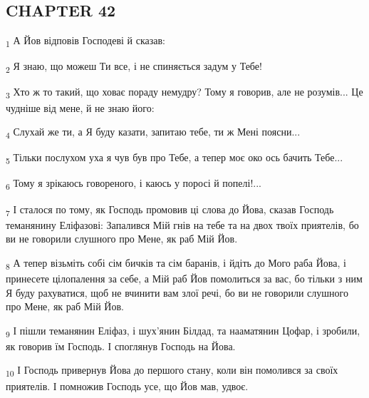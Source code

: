 \subsection{CHAPTER 42}
\begin{tcolorbox}
\textsubscript{1} А Йов відповів Господеві й сказав:
\end{tcolorbox}
\begin{tcolorbox}
\textsubscript{2} Я знаю, що можеш Ти все, і не спиняється задум у Тебе!
\end{tcolorbox}
\begin{tcolorbox}
\textsubscript{3} Хто ж то такий, що ховає пораду немудру? Тому я говорив, але не розумів... Це чудніше від мене, й не знаю його:
\end{tcolorbox}
\begin{tcolorbox}
\textsubscript{4} Слухай же ти, а Я буду казати, запитаю тебе, ти ж Мені поясни...
\end{tcolorbox}
\begin{tcolorbox}
\textsubscript{5} Тільки послухом уха я чув був про Тебе, а тепер моє око ось бачить Тебе...
\end{tcolorbox}
\begin{tcolorbox}
\textsubscript{6} Тому я зрікаюсь говореного, і каюсь у поросі й попелі!...
\end{tcolorbox}
\begin{tcolorbox}
\textsubscript{7} І сталося по тому, як Господь промовив ці слова до Йова, сказав Господь теманянину Еліфазові: Запалився Мій гнів на тебе та на двох твоїх приятелів, бо ви не говорили слушного про Мене, як раб Мій Йов.
\end{tcolorbox}
\begin{tcolorbox}
\textsubscript{8} А тепер візьміть собі сім бичків та сім баранів, і йдіть до Мого раба Йова, і принесете цілопалення за себе, а Мій раб Йов помолиться за вас, бо тільки з ним Я буду рахуватися, щоб не вчинити вам злої речі, бо ви не говорили слушного про Мене, як раб Мій Йов.
\end{tcolorbox}
\begin{tcolorbox}
\textsubscript{9} І пішли теманянин Еліфаз, і шух'янин Білдад, та нааматянин Цофар, і зробили, як говорив їм Господь. І споглянув Господь на Йова.
\end{tcolorbox}
\begin{tcolorbox}
\textsubscript{10} І Господь привернув Йова до першого стану, коли він помолився за своїх приятелів. І помножив Господь усе, що Йов мав, удвоє.
\end{tcolorbox}
